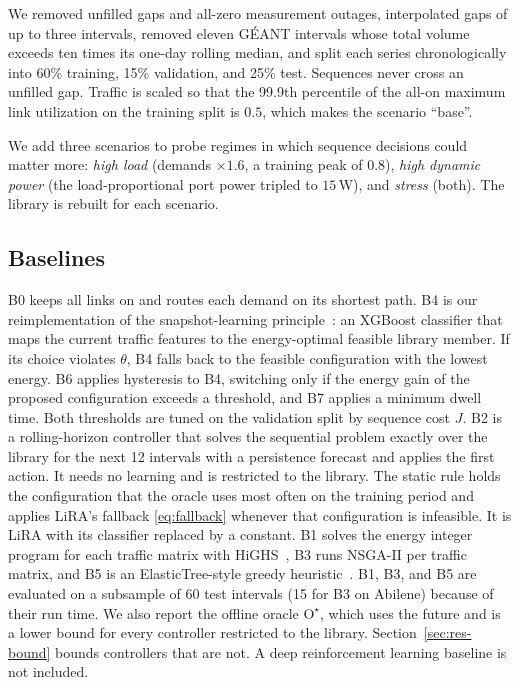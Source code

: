 \documentclass[5p,times]{elsarticle}
\begin{document}
We removed unfilled gaps and all-zero measurement outages, interpolated gaps of up to three intervals, removed eleven G\'{E}ANT intervals whose total volume exceeds ten times its one-day rolling median, and split each series chronologically into 60\% training, 15\% validation, and 25\% test. Sequences never cross an unfilled gap. Traffic is scaled so that the 99.9th percentile of the all-on maximum link utilization on the training split is $0.5$, which makes the scenario ``base''.

We add three scenarios to probe regimes in which sequence decisions could matter more: \emph{high load} (demands $\times1.6$, a training peak of $0.8$), \emph{high dynamic power} (the load-proportional port power tripled to $15$\,W), and \emph{stress} (both). The library is rebuilt for each scenario.


\subsection{Baselines}

B0 keeps all links on and routes each demand on its shortest path. B4 is our reimplementation of the snapshot-learning principle~\cite{gomezdelahiz2025noms,gomezdelahiz2026tgcn}: an XGBoost classifier that maps the current traffic features to the energy-optimal feasible library member. If its choice violates $\theta$, B4 falls back to the feasible configuration with the lowest energy. B6 applies hysteresis to B4, switching only if the energy gain of the proposed configuration exceeds a threshold, and B7 applies a minimum dwell time. Both thresholds are tuned on the validation split by sequence cost $J$. B2 is a rolling-horizon controller that solves the sequential problem exactly over the library for the next 12 intervals with a persistence forecast and applies the first action. It needs no learning and is restricted to the library. The static rule holds the configuration that the oracle uses most often on the training period and applies LiRA's fallback \eqref{eq:fallback} whenever that configuration is infeasible. It is LiRA with its classifier replaced by a constant. B1 solves the energy integer program for each traffic matrix with HiGHS~\cite{huangfu2018highs}, B3 runs NSGA-II per traffic matrix, and B5 is an ElasticTree-style greedy heuristic~\cite{heller2010elastictree}. B1, B3, and B5 are evaluated on a subsample of 60 test intervals (15 for B3 on Abilene) because of their run time. We also report the offline oracle $\mathrm{O}^\star$, which uses the future and is a lower bound for every controller restricted to the library. Section~\ref{sec:res-bound} bounds controllers that are not. A deep reinforcement learning baseline is not included.
\end{document}
